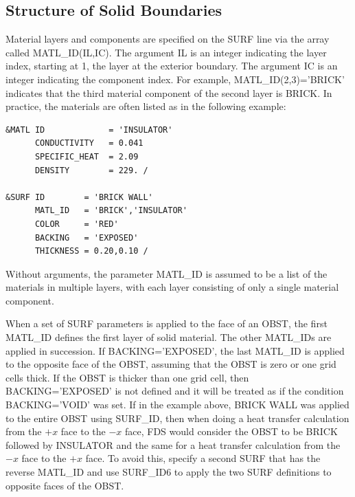 \documentclass[11pt]{book}
\begin{document}
\subsection{Structure of Solid Boundaries}

Material layers and components are specified on the {\ct SURF} line via the array called {\ct MATL\_ID(IL,IC)}. The argument {\ct IL} is an integer indicating the layer index, starting at 1, the layer at the exterior boundary. The argument {\ct IC} is an integer indicating the component index. For example, {\ct MATL\_ID(2,3)='BRICK'} indicates that the third material component of the second layer is {\ct BRICK}. In practice, the materials are often listed as in the following example:
\begin{lstlisting}
&MATL ID             = 'INSULATOR'
      CONDUCTIVITY   = 0.041
      SPECIFIC_HEAT  = 2.09
      DENSITY        = 229. /

&SURF ID        = 'BRICK WALL'
      MATL_ID   = 'BRICK','INSULATOR'
      COLOR     = 'RED'
      BACKING   = 'EXPOSED'
      THICKNESS = 0.20,0.10 /
\end{lstlisting}
Without arguments, the parameter {\ct MATL\_ID} is assumed to be a list of the materials in multiple layers, with each layer consisting of only a single material component.

When a set of {\ct SURF} parameters is applied to the face of an {\ct OBST}, the first {\ct MATL\_ID} defines the first layer of solid material. The other {\ct MATL\_ID}s are applied in succession. If {\ct BACKING='EXPOSED'}, the last {\ct MATL\_ID} is applied to the opposite face of the {\ct OBST}, assuming that the {\ct OBST} is zero or one grid cells thick. If the {\ct OBST} is thicker than one grid cell, then {\ct BACKING='EXPOSED'} is not defined and it will be treated as if the condition {\ct BACKING='VOID'} was set. If in the example above, {\ct BRICK WALL} was applied to the entire {\ct OBST} using {\ct SURF\_ID}, then when doing a heat transfer calculation from the $+x$ face to the $-x$ face, FDS would consider the {\ct OBST} to be {\ct BRICK} followed by {\ct INSULATOR} and the same for a heat transfer
calculation from the $-x$ face to the $+x$ face.  To avoid this, specify a second {\ct SURF} that has the reverse {\ct MATL\_ID} and use {\ct SURF\_ID6} to apply the two {\ct SURF} definitions to opposite faces of the {\ct OBST}.
\end{document}
